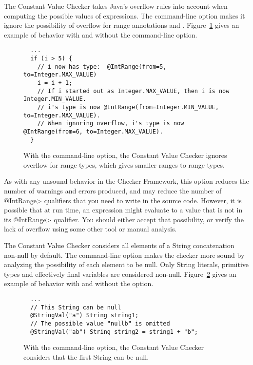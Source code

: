 
The Constant Value Checker takes Java's overflow rules into account when
computing the possible values of expressions.
%
The  command-line option makes it ignore the
possibility of overflow for range annotations
 and
.
%
Figure~\ref{fig-value-ignore-overflow} gives an example of behavior with
and without the  command-line option.

\begin{figure}
\begin{Verbatim}
  ...
  if (i > 5) {
    // i now has type:  @IntRange(from=5, to=Integer.MAX_VALUE)
    i = i + 1;
    // If i started out as Integer.MAX_VALUE, then i is now Integer.MIN_VALUE.
    // i's type is now @IntRange(from=Integer.MIN_VALUE, to=Integer.MAX_VALUE).
    // When ignoring overflow, i's type is now @IntRange(from=6, to=Integer.MAX_VALUE).
  }
\end{Verbatim}
\caption{With the  command-line option,
the Constant Value Checker ignores overflow
for range types, which gives smaller ranges to range types.}
\label{fig-value-ignore-overflow}
\end{figure}

As with any unsound behavior in the Checker Framework, this option reduces
the number of warnings and errors produced, and may reduce the number of
\<@IntRange> qualifiers that you need to write in the source code.
However, it is possible that at run time, an expression might evaluate to a
value that is not in its \<@IntRange> qualifier.  You should either accept
that possibility, or verify the lack of overflow using some other tool or
manual analysis.


The Constant Value Checker considers all elements of a String concatenation
non-null by default. The  command-line option
makes the checker more sound by analyzing the possibility of each element to
be null. Only String literals, primitive types and effectively final variables
are considered non-null. Figure~\ref{fig-null-strings-concat} gives an example
of behavior with and without the  option.

\begin{figure}
\begin{Verbatim}
  ...
  // This String can be null
  @StringVal("a") String string1;
  // The possible value "nullb" is omitted
  @StringVal("ab") String string2 = string1 + "b";
\end{Verbatim}
\caption{With the  command-line option, the
Constant Value Checker considers that the first String can be null.}
\label{fig-null-strings-concat}
\end{figure}

